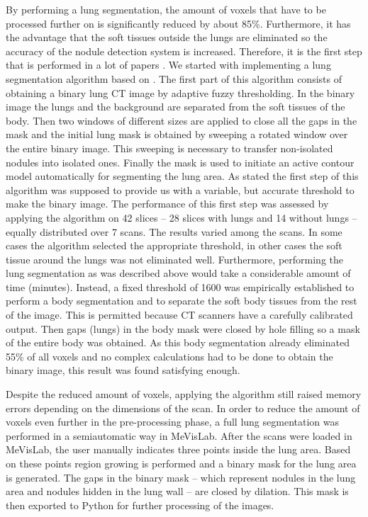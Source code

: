 By performing a lung segmentation, the amount of voxels that have to be
processed further on is significantly reduced by about 85\%. Furthermore, it has
the advantage that the soft tissues outside the lungs are eliminated so the
accuracy of the nodule detection system is increased. Therefore, it is the first
step that is performed in a lot of papers \cite{keshani, elbaz, teramoto}. We
started with implementing a lung segmentation algorithm based on \cite{keshani}.
The first part of this algorithm consists of obtaining a binary lung CT image by
adaptive fuzzy thresholding. In the binary image the lungs and the background
are separated from the soft tissues of the body.
Then two windows of different sizes are applied to close all the gaps in the
mask and the initial lung mask is obtained by sweeping a rotated window over the
entire binary image.
This sweeping is necessary to transfer non-isolated nodules into isolated ones.
Finally the mask is used to initiate an active contour model automatically for
segmenting the lung area. As stated the first step of this algorithm was
supposed to provide us with a variable, but accurate threshold to make the
binary image. The performance of this first step was assessed by applying the
algorithm on 42 slices -- 28 slices with lungs and 14 without lungs -- equally
distributed over 7 scans. The results varied among the scans. In some cases the
algorithm selected the appropriate threshold, in other cases the soft tissue
around the lungs was not eliminated well. Furthermore, performing the lung
segmentation as was described above would take a considerable amount of time
(minutes). Instead, a fixed threshold of 1600 was empirically established to
perform a body segmentation and to separate the soft body tissues from the rest
of the image. This is permitted because CT scanners have a carefully calibrated
output. Then gaps (lungs) in the body mask were closed by hole filling so a mask
of the entire body was obtained. As this body segmentation already eliminated
55\% of all voxels and no complex calculations had to be done to obtain the
binary image, this result was found satisfying enough.

Despite the reduced amount of voxels, applying the algorithm still raised memory
errors depending on the dimensions of the scan.
In order to reduce the amount of voxels even further in the pre-processing
phase, a full lung segmentation was performed in a semiautomatic way in
MeVisLab. After the scans were loaded in MeVisLab, the user manually indicates
three points inside the lung area. Based on these points region growing is
performed and a binary mask for the lung area is generated. The gaps in the
binary mask -- which represent nodules in the lung area and nodules hidden in
the lung wall -- are closed by dilation. This mask is then exported to Python
for further processing of the images. 

